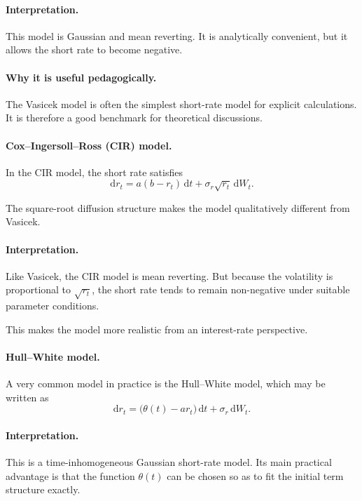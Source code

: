 \documentclass[11pt]{article}
\theoremstyle{plain}
\theoremstyle{definition}
\theoremstyle{remark}
\begin{document}
\paragraph{Interpretation.}
This model is Gaussian and mean reverting.
It is analytically convenient, but it allows the short rate to become
negative.

\paragraph{Why it is useful pedagogically.}
The Vasicek model is often the simplest short-rate model for explicit
calculations.
It is therefore a good benchmark for theoretical discussions.

\paragraph{Cox--Ingersoll--Ross (CIR) model.}
In the CIR model, the short rate satisfies
\[
\boxed{
\mathrm{d}r_t=a(b-r_t)\,\mathrm{d}t+\sigma_r\sqrt{r_t}\,\mathrm{d}W_t.
}
\]

The square-root diffusion structure makes the model qualitatively
different from Vasicek.

\paragraph{Interpretation.}
Like Vasicek, the CIR model is mean reverting.
But because the volatility is proportional to \(\sqrt{r_t}\), the short
rate tends to remain non-negative under suitable parameter conditions.

This makes the model more realistic from an interest-rate perspective.

\paragraph{Hull--White model.}
A very common model in practice is the Hull--White model, which may be
written as
\[
\boxed{
\mathrm{d}r_t=\big(\theta(t)-a r_t\big)\,\mathrm{d}t+\sigma_r\,\mathrm{d}W_t.
}
\]

\paragraph{Interpretation.}
This is a time-inhomogeneous Gaussian short-rate model.
Its main practical advantage is that the function \(\theta(t)\) can be
chosen so as to fit the initial term structure exactly.
\end{document}
